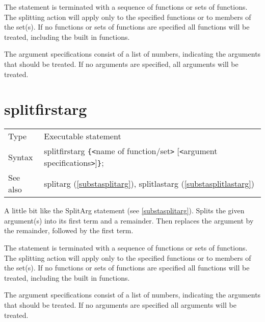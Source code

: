 
\noindent The statement is terminated with a sequence of functions or 
sets of functions. The splitting action will apply only to the 
specified functions or to members of the set(s). If no functions or sets of 
functions are specified all functions will be treated, including the built 
in functions.
 
\noindent The argument specifications consist of a list of numbers, 
indicating the arguments that should be treated. If no arguments are 
specified, all arguments will be treated. \vspace{10mm}


\section{splitfirstarg}
\label{substasplitfirstarg}

\noindent \begin{tabular}{ll}
Type & Executable statement\\
Syntax & splitfirstarg \verb:{:{\tt<}name of function/set{\tt>}
         [{\tt<}argument specifications{\tt>}]\verb:}:;
\\ See also & splitarg (\ref{substasplitarg}),
             splitlastarg (\ref{substasplitlastarg})
\end{tabular}\vspace{4mm}

\noindent A little bit like the 
SplitArg statement (see \ref{substasplitarg}). Splits the 
given argument(s) into its first term and a remainder. Then replaces the 
argument by the remainder, followed by the first term.

\noindent The statement is terminated with a sequence of functions or sets 
of functions. The splitting action will apply only to the specified 
functions or to members of the set(s). If no functions or sets 
of functions are specified all functions will be treated, including the 
built in functions.
 
\noindent The argument specifications consist of a list of numbers, 
indicating the arguments that should be treated. If no arguments are 
specified all arguments will be treated. \vspace{10mm}

